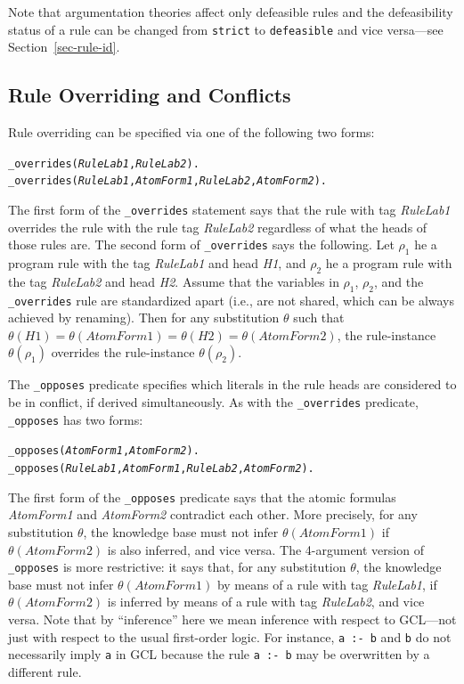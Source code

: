 \documentclass[11pt]{article}
\begin{document}
Note that argumentation theories affect only defeasible rules and the
defeasibility status of a rule can be changed from \texttt{strict} to
\texttt{defeasible} and vice versa---see
Section~\ref{sec-rule-id}.

\subsection{Rule Overriding and Conflicts}\label{sec-overriding-conflict}

Rule overriding can be specified via one of the following two forms:
\begin{alltt}
  _overrides({\em{}RuleLab1},\emph{RuleLab2}).
  _overrides({\em{}RuleLab1},{\em{}AtomForm1},{\em{}RuleLab2},\emph{AtomForm2}).
\end{alltt}
The first form of the {\tt \_overrides} statement says that the rule with
tag \emph{RuleLab1} overrides the rule with the rule tag
\emph{RuleLab2} regardless of what the heads of those rules are. The second
form of {\tt \_overrides} says the following. Let $\rho_1$ he a program
rule with the tag \emph{RuleLab1} and head \emph{H1}, and $\rho_2$ he a
program rule with the tag \emph{RuleLab2} and head \emph{H2}. Assume that
the variables in $\rho_1$, $\rho_2$, and the {\tt \_overrides} rule are
standardized apart (i.e., are not shared, which can be always achieved by
renaming).   Then for any substitution $\theta$ such that $\theta(H1) =
\theta(AtomForm1) = \theta(H2) = \theta(AtomForm2)$, the rule-instance
$\theta(\rho_1)$ overrides the rule-instance $\theta(\rho_2)$.

The {\tt \_opposes} predicate specifies which literals in the rule heads
are considered to be in conflict, if derived simultaneously. As with the
{\tt \_overrides} predicate, {\tt \_opposes} has two forms:
\begin{alltt}
  _opposes({\em{}AtomForm1},\emph{AtomForm2}).
  _opposes({\em{}RuleLab1},{\em{}AtomForm1},{\em{}RuleLab2},\emph{AtomForm2}).
\end{alltt}
The first form of the {\tt \_opposes} predicate says that the atomic
formulas \emph{AtomForm1} and \emph{AtomForm2} contradict each other.  More
precisely, for any substitution $\theta$, the knowledge
base must not infer $\theta(AtomForm1)$ if $\theta(AtomForm2)$ is also
inferred, and vice versa.  The 4-argument version of {\tt \_opposes} is
more restrictive: it says that, for any substitution $\theta$, the
knowledge base must not infer $\theta(AtomForm1)$ by means of a rule with
tag \emph{RuleLab1}, if $\theta(AtomForm2)$ is inferred by means of a
rule with tag \emph{RuleLab2}, and vice versa.
Note that by ``inference'' here we mean inference with respect to GCL---not just
with respect to the usual first-order logic. For instance, {\tt a :- b} and
{\tt b} do not necessarily imply {\tt a} in GCL because the rule {\tt a :-
  b} may be overwritten by a different rule.      
\end{document}
